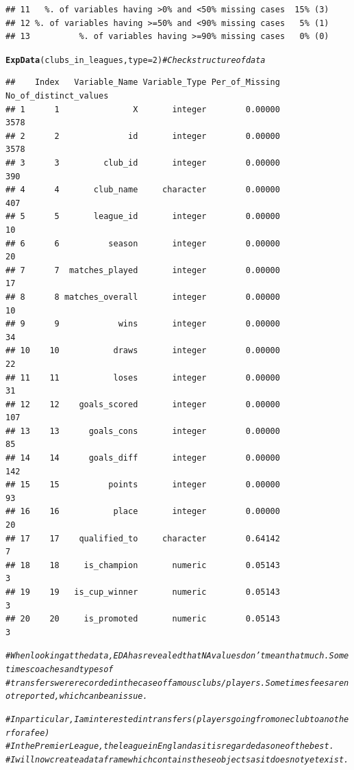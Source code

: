 \documentclass{article}\usepackage[]{graphicx}\usepackage[]{color}
\makeatletter
\newcommand{\hlnum}[1]{\textcolor[rgb]{0.686,0.059,0.569}{#1}}%
\newcommand{\hlcom}[1]{\textcolor[rgb]{0.678,0.584,0.686}{\textit{#1}}}%
\newcommand{\hlstd}[1]{\textcolor[rgb]{0.345,0.345,0.345}{#1}}%
\newcommand{\hlkwc}[1]{\textcolor[rgb]{0.333,0.667,0.333}{#1}}%
\newcommand{\hlkwd}[1]{\textcolor[rgb]{0.737,0.353,0.396}{\textbf{#1}}}%
\newenvironment{kframe}{%
 \def\at@end@of@kframe{}%
 \ifinner\ifhmode%
  \def\at@end@of@kframe{\end{minipage}}%
  \begin{minipage}{\columnwidth}%
 \fi\fi%
 \def\FrameCommand##1{\hskip\@totalleftmargin \hskip-\fboxsep
 \colorbox{shadecolor}{##1}\hskip-\fboxsep
     \hskip-\linewidth \hskip-\@totalleftmargin \hskip\columnwidth}%
 \MakeFramed {\advance\hsize-\width
   \@totalleftmargin\z@ \linewidth\hsize
   \@setminipage}}%
 {\par\unskip\endMakeFramed%
 \at@end@of@kframe}
\newenvironment{knitrout}{}{} %
\makeatother
\begin{document}
\begin{knitrout}
\begin{kframe}
\begin{verbatim}
## 11   %. of variables having >0% and <50% missing cases  15% (3)
## 12 %. of variables having >=50% and <90% missing cases   5% (1)
## 13          %. of variables having >=90% missing cases   0% (0)
\end{verbatim}
\begin{alltt}
\hlkwd{ExpData}\hlstd{(clubs_in_leagues,} \hlkwc{type}\hlstd{=}\hlnum{2}\hlstd{)} \hlcom{# Check structure of data}
\end{alltt}
\begin{verbatim}
##    Index   Variable_Name Variable_Type Per_of_Missing No_of_distinct_values
## 1      1               X       integer        0.00000                  3578
## 2      2              id       integer        0.00000                  3578
## 3      3         club_id       integer        0.00000                   390
## 4      4       club_name     character        0.00000                   407
## 5      5       league_id       integer        0.00000                    10
## 6      6          season       integer        0.00000                    20
## 7      7  matches_played       integer        0.00000                    17
## 8      8 matches_overall       integer        0.00000                    10
## 9      9            wins       integer        0.00000                    34
## 10    10           draws       integer        0.00000                    22
## 11    11           loses       integer        0.00000                    31
## 12    12    goals_scored       integer        0.00000                   107
## 13    13      goals_cons       integer        0.00000                    85
## 14    14      goals_diff       integer        0.00000                   142
## 15    15          points       integer        0.00000                    93
## 16    16           place       integer        0.00000                    20
## 17    17    qualified_to     character        0.64142                     7
## 18    18     is_champion       numeric        0.05143                     3
## 19    19   is_cup_winner       numeric        0.05143                     3
## 20    20     is_promoted       numeric        0.05143                     3
\end{verbatim}
\begin{alltt}
\hlcom{# When looking at the data, EDA has revealed that NA values don't mean that much. Sometimes coaches and types of}
\hlcom{# transfers were recorded in the case of famous clubs/players. Sometimes fees are not reported, which can be an issue.}

\hlcom{# In particular, I am interested in transfers (players going from one club to another for a fee)}
\hlcom{# In the Premier League, the league in England as it is regarded as one of the best.}
\hlcom{# I will now create a data frame which contains these objects as it does not yet exist.}


\end{alltt}
\end{kframe}
\end{knitrout}
\end{document}
